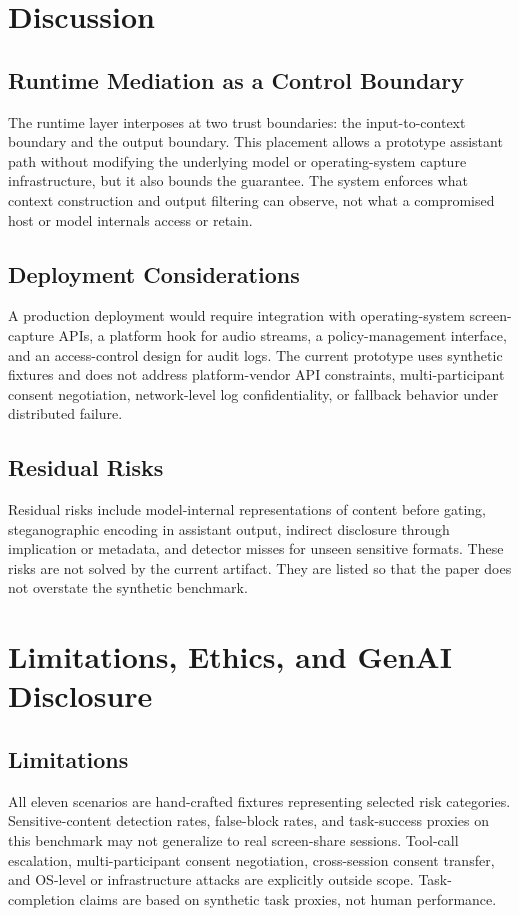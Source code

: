 \documentclass[manuscript,review,anonymous]{acmart}
\begin{document}
\section{Discussion}
\subsection{Runtime Mediation as a Control Boundary}
The runtime layer interposes at two trust boundaries: the input-to-context boundary and the output boundary.
This placement allows a prototype assistant path without modifying the underlying model or operating-system capture infrastructure, but it also bounds the guarantee.
The system enforces what context construction and output filtering can observe, not what a compromised host or model internals access or retain.

\subsection{Deployment Considerations}
A production deployment would require integration with operating-system screen-capture APIs, a platform hook for audio streams, a policy-management interface, and an access-control design for audit logs.
The current prototype uses synthetic fixtures and does not address platform-vendor API constraints, multi-participant consent negotiation, network-level log confidentiality, or fallback behavior under distributed failure.

\subsection{Residual Risks}
Residual risks include model-internal representations of content before gating, steganographic encoding in assistant output, indirect disclosure through implication or metadata, and detector misses for unseen sensitive formats.
These risks are not solved by the current artifact.
They are listed so that the paper does not overstate the synthetic benchmark.

\section{Limitations, Ethics, and GenAI Disclosure}
\subsection{Limitations}
All eleven scenarios are hand-crafted fixtures representing selected risk categories.
Sensitive-content detection rates, false-block rates, and task-success proxies on this benchmark may not generalize to real screen-share sessions.
Tool-call escalation, multi-participant consent negotiation, cross-session consent transfer, and OS-level or infrastructure attacks are explicitly outside scope.
Task-completion claims are based on synthetic task proxies, not human performance.
\end{document}
